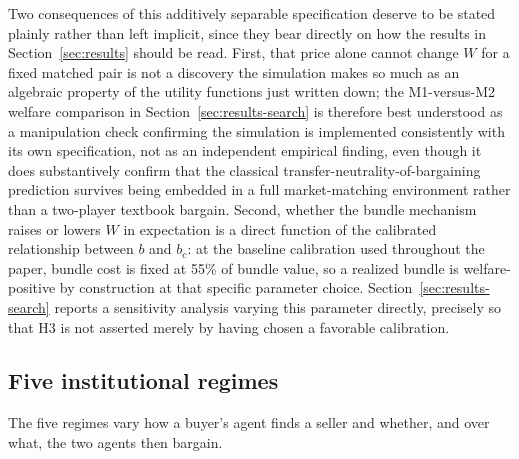 \documentclass[review]{elsarticle}
\begin{document}
Two consequences of this additively separable specification deserve to be stated plainly rather than left implicit, since they bear directly on how the results in Section~\ref{sec:results} should be read. First, that price alone cannot change $W$ for a fixed matched pair is not a discovery the simulation makes so much as an algebraic property of the utility functions just written down; the M1-versus-M2 welfare comparison in Section~\ref{sec:results-search} is therefore best understood as a manipulation check confirming the simulation is implemented consistently with its own specification, not as an independent empirical finding, even though it does substantively confirm that the classical transfer-neutrality-of-bargaining prediction \citep{rubinstein1982perfect} survives being embedded in a full market-matching environment rather than a two-player textbook bargain. Second, whether the bundle mechanism raises or lowers $W$ in expectation is a direct function of the calibrated relationship between $b$ and $b_c$: at the baseline calibration used throughout the paper, bundle cost is fixed at 55\% of bundle value, so a realized bundle is welfare-positive by construction at that specific parameter choice. Section~\ref{sec:results-search} reports a sensitivity analysis varying this parameter directly, precisely so that H3 is not asserted merely by having chosen a favorable calibration.

\subsection{Five institutional regimes}
\label{sec:model-regimes}

The five regimes vary how a buyer's agent finds a seller and whether, and over what, the two agents then bargain.
\end{document}
